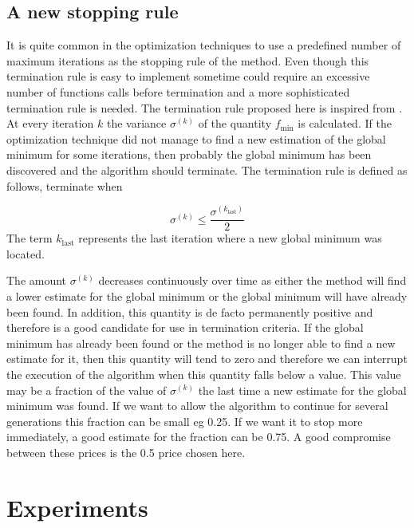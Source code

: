 \documentclass[symmetry,article,submit,moreauthors,pdftex]{mdpi}
\begin{document}
\subsection{A new stopping rule \label{subsec:A-new-stopping}}

It is quite common in the optimization techniques to use a predefined
number of maximum iterations as the stopping rule of the method. Even
though this termination rule is easy to implement sometime could require
an excessive number of functions calls before termination and a more
sophisticated termination rule is needed.\textbf{ }The termination
rule proposed here is inspired from \cite{psotsoulos}. At every iteration
$k$ the variance\textbf{ $\sigma^{(k)}$ }of the quantity $f_{\mbox{min}}$
is calculated. If the optimization technique did not manage to find
a new estimation of the global minimum for some iterations, then probably the global minimum has been discovered and
 the algorithm should terminate. The termination rule
is defined as follows, terminate when 

\textbf{
\begin{equation}
\sigma^{(k)}\le\frac{\sigma^{\left(k_{\mbox{last}}\right)}}{2}\label{eq:termination_mine}
\end{equation}
}The term\textbf{ $k_{\mbox{last}}$ }represents the last iteration
where a new global minimum was located. 


The amount $\sigma^{(k)}$ decreases continuously over time as either the method will find a lower estimate for the global minimum or the global minimum will have already been found. In addition, this quantity is de facto permanently positive and therefore is a good candidate  for use in termination criteria. If the global minimum has already been found or the method is no longer able to find a new estimate for it, then this quantity will tend to zero and therefore we can interrupt the execution of the algorithm when this quantity falls below a value. This value may be a fraction of the value of $\sigma^{(k)}$ the last time a new estimate for the global minimum was found. If we want to allow the algorithm to continue for several generations this fraction can be small eg 0.25. If we want it to stop more immediately, a good estimate for the fraction can be 0.75. A good compromise between these prices is the 0.5 price chosen here. 

\section{Experiments \label{sec:Experiments}}
\end{document}
